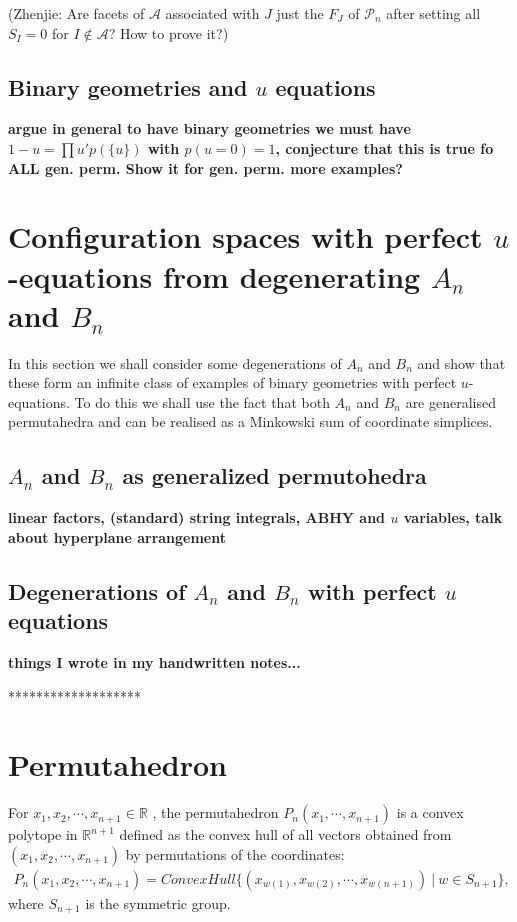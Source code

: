 \documentclass[hidelinks,12pt]{article}
\newcommand{\bea}[1]{\begin{eqnarray}\label{#1} }
\newcommand{\eea}{\end{eqnarray}}
\def\bea{\begin{eqnarray}}
\def\eea{\end{eqnarray}}
\begin{document}
(Zhenjie: Are facets of $\mathscr A$ associated with $J$ just the $F_J$ of $\mathscr P_n$ after setting all $S_I=0$ for $I\not\in \mathscr A$? How to prove it?)

\subsection{Binary geometries and $u$ equations}

{\bf argue in general to have binary geometries we must have $1-u=\prod u' p(\{u\})$ with $p(u=0)=1$, conjecture that this is true fo ALL gen. perm. Show it for gen. perm. more examples?}

\section{Configuration spaces with perfect $u$-equations from degenerating $A_n$ and $B_n$}
In this section we shall consider some degenerations of $A_n$ and $B_n$ and show that these form an infinite class of examples of binary geometries with perfect $u$-equations. To do this we shall use the fact that both $A_n$ and $B_n$ are generalised permutahedra and can be realised as a Minkowski sum of coordinate simplices. 

\subsection{$A_n$ and $B_n$ as generalized permutohedra} 

{\bf linear factors, (standard) string integrals, ABHY and $u$ variables, talk about hyperplane arrangement}

\subsection{Degenerations of $A_n$ and $B_n$ with perfect $u$ equations} 

{\bf things I wrote in my handwritten notes...}

*******************

\section*{Permutahedron}
 For $x_1,x_2, \cdots, x_{n+1} \in \mathbb{R} $ , the permutahedron $P_n(x_1,\cdots,x_{n+1})$ is a convex polytope in $\mathbb{R}^{n+1}$ defined as the convex hull of all vectors obtained from $(x_1,x_2, \cdots, x_{n+1})$ by permutations of the coordinates:
 \bea
 P_n(x_1,x_2, \cdots, x_{n+1}) = ConvexHull \{ (x_{w(1)},x_{w(2)}, \cdots, x_{w(n+1)})~ |~ w \in S_{n+1} \}, \nonumber
 \eea
 where $S_{n+1}$ is the symmetric group. 
 
\end{document}
